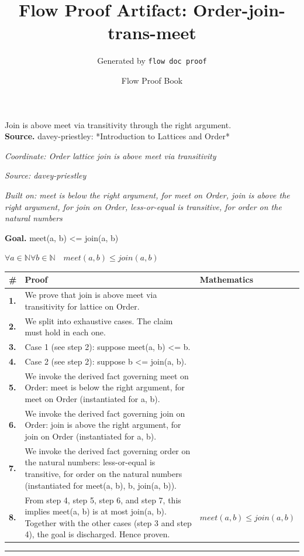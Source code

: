 \documentclass[11pt]{article}
\title{Flow Proof Artifact: Order-join-trans-meet}
\author{Generated by \texttt{flow doc proof}}
\date{Flow Proof Book}
\theoremstyle{definition}
\begin{document}
\maketitle
Join is above meet via transitivity through the right argument.\\[0.5em]
\textbf{Source.} davey-priestley: *Introduction to Lattices and Order*\\[0.5em]
\bigskip
{}\par
\smallskip\noindent\textit{Coordinate: Order \cdot lattice \cdot join is above meet via transitivity}\par
\smallskip\noindent\textit{Source: davey-priestley}\par
\smallskip\noindent\textit{Built on: meet is below the right argument, for meet on Order, join is above the right argument, for join on Order, less-or-equal is transitive, for order on the natural numbers}\par
\medskip
\noindent\textbf{Goal.} meet(a, b) <= join(a, b)\par
\noindent$\displaystyle \forall a \in \mathbb{N} \forall b \in \mathbb{N}\quad meet(a, b) \le join(a, b)$\par
\medskip
\noindent
\begin{tabular}{@{} >{\raggedright\arraybackslash}p{} >{\raggedright\arraybackslash}p{} >{\raggedleft\arraybackslash}p{} @{}}
\textbf{\#} & \textbf{Proof} & \textbf{Mathematics} \\
\midrule
\textbf{1.} & We prove that join is above meet via transitivity for lattice on Order. & \\[0.45em]
\textbf{2.} & We split into exhaustive cases. The claim must hold in each one. & \\[0.45em]
\textbf{3.} & Case 1 (see step 2): suppose meet(a, b) <= b. & \\[0.45em]
\textbf{4.} & Case 2 (see step 2): suppose b <= join(a, b). & \\[0.45em]
\textbf{5.} & We invoke the derived fact governing meet on Order: meet is below the right argument, for meet on Order (instantiated for a, b). & \\[0.45em]
\textbf{6.} & We invoke the derived fact governing join on Order: join is above the right argument, for join on Order (instantiated for a, b). & \\[0.45em]
\textbf{7.} & We invoke the derived fact governing order on the natural numbers: less-or-equal is transitive, for order on the natural numbers (instantiated for meet(a, b), b, join(a, b)). & \\[0.45em]
\textbf{8.} & From step 4, step 5, step 6, and step 7, this implies meet(a, b) is at most join(a, b). Together with the other cases (step 3 and step 4), the goal is discharged. Hence proven. & $\displaystyle meet(a, b) \le join(a, b)$ \\[0.45em]
\bottomrule
\end{tabular}
\label{thm:Order-lattice-join_is_above_meet_via_transitivity}
\par\medskip\hrule
\end{document}
